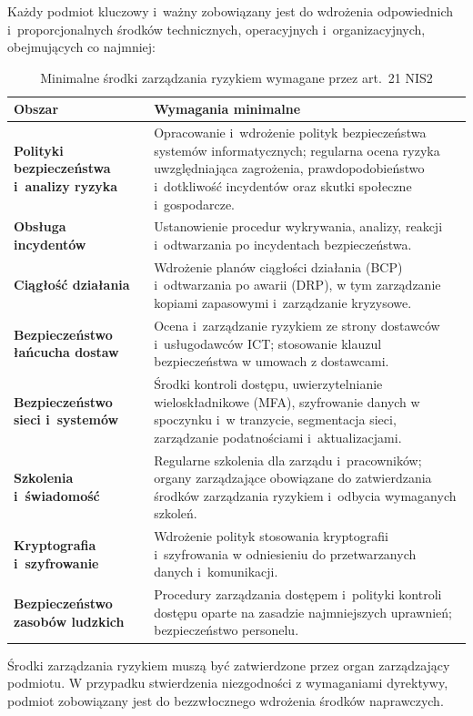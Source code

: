 Każdy podmiot kluczowy i~ważny zobowiązany jest do wdrożenia odpowiednich i~proporcjonalnych środków technicznych, operacyjnych i~organizacyjnych,
obejmujących co najmniej:

\begin{table}[H]
\centering
\caption{Minimalne środki zarządzania ryzykiem wymagane przez art.~21 NIS2}
\label{tab:nis2_ryzyko}
\begin{tabular}{>{\bfseries}p{4.5cm} p{8.5cm}}
\hline
Obszar & Wymagania minimalne \\
\hline
Polityki bezpieczeństwa i~analizy ryzyka
  & Opracowanie i~wdrożenie polityk bezpieczeństwa systemów informatycznych;
    regularna ocena ryzyka uwzględniająca zagrożenia, prawdopodobieństwo
    i~dotkliwość incydentów oraz skutki społeczne i~gospodarcze. \\[4pt]
Obsługa incydentów
  & Ustanowienie procedur wykrywania, analizy, reakcji i~odtwarzania
    po incydentach bezpieczeństwa. \\[4pt]
Ciągłość działania
  & Wdrożenie planów ciągłości działania (BCP) i~odtwarzania po awarii (DRP),
    w tym zarządzanie kopiami zapasowymi i~zarządzanie kryzysowe. \\[4pt]
Bezpieczeństwo łańcucha dostaw
  & Ocena i~zarządzanie ryzykiem ze strony dostawców i~usługodawców ICT;
    stosowanie klauzul bezpieczeństwa w umowach z dostawcami. \\[4pt]
Bezpieczeństwo sieci i~systemów
  & Środki kontroli dostępu, uwierzytelnianie wieloskładnikowe (MFA),
    szyfrowanie danych w spoczynku i~w tranzycie, segmentacja sieci,
    zarządzanie podatnościami i~aktualizacjami. \\[4pt]
Szkolenia i~świadomość
  & Regularne szkolenia dla zarządu i~pracowników; organy zarządzające
    obowiązane do zatwierdzania środków zarządzania ryzykiem i~odbycia
    wymaganych szkoleń. \\[4pt]
Kryptografia i~szyfrowanie
  & Wdrożenie polityk stosowania kryptografii i~szyfrowania w odniesieniu
    do przetwarzanych danych i~komunikacji. \\[4pt]
Bezpieczeństwo zasobów ludzkich
  & Procedury zarządzania dostępem i~polityki kontroli dostępu oparte
    na zasadzie najmniejszych uprawnień; bezpieczeństwo personelu. \\
\hline
\end{tabular}
\end{table}

Środki zarządzania ryzykiem muszą być zatwierdzone przez organ zarządzający podmiotu. W przypadku stwierdzenia niezgodności z wymaganiami dyrektywy,
podmiot zobowiązany jest do bezzwłocznego wdrożenia środków naprawczych.

